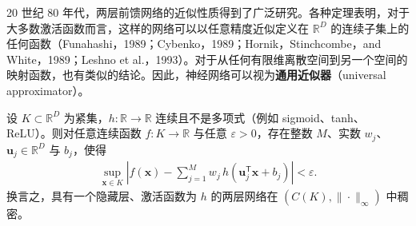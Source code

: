 \documentclass[../../main.tex]{subfiles}
\begin{document}
20 世纪 80 年代，两层前馈网络的近似性质得到了广泛研究。各种定理表明，对于大多数激活函数而言，这样的网络可以以任意精度近似定义在 $\mathbb{R}^{D}$ 的连续子集上的任何函数（Funahashi，1989；Cybenko，1989；Hornik，Stinchcombe，and White，1989；Leshno et al.，1993）。对于从任何有限维离散空间到另一个空间的映射函数，也有类似的结论。因此，神经网络可以视为\textbf{通用近似器}（universal approximator）。

\begin{theorem}[通用近似定理]\label{theorem:ch06-通用近似}
设 $K\subset\mathbb{R}^{D}$ 为紧集，$h:\mathbb{R}\to\mathbb{R}$ 连续且不是多项式（例如 sigmoid、tanh、ReLU）。则对任意连续函数 $f:K\to\mathbb{R}$ 与任意 $\varepsilon>0$，存在整数 $M$、实数 $w_j$、$\boldsymbol{u}_j\in\mathbb{R}^{D}$ 与 $b_j$，使得
\begin{align}
\sup_{\boldsymbol{x}\in K}\left|f(\boldsymbol{x})-\sum_{j=1}^{M}w_j\,h\!\left(\boldsymbol{u}_j^{\mathsf T}\boldsymbol{x}+b_j\right)\right|<\varepsilon .
\label{align:ch06-通用近似}
\end{align}
换言之，具有一个隐藏层、激活函数为 $h$ 的两层网络在 $(C(K),\|\cdot\|_{\infty})$ 中稠密。
\end{theorem}
\end{document}
